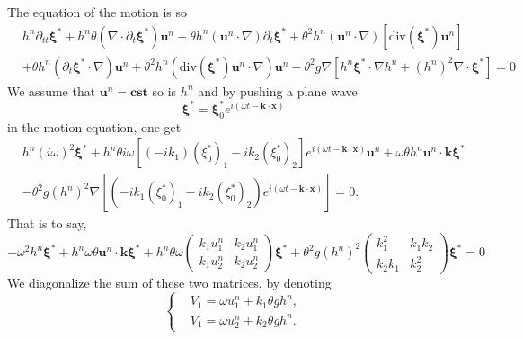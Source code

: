 \documentclass[a4paper, 11pt]{article}
\begin{document}
The equation of the motion is so
\begin{equation*}
\begin{split}
&h^n\partial_{tt}\boldsymbol{\xi}^*+h^n\theta(\nabla \cdot \partial_t \boldsymbol{\xi}^*)\boldsymbol{u}^n+\theta h^n\left(\boldsymbol{u}^n\cdot \nabla \right)\partial_t \boldsymbol{\xi}^*+\theta^2h^n\left(\boldsymbol{u}^n\cdot \nabla \right)\left[\text{div}(\boldsymbol{\xi}^*)\boldsymbol{u}^n\right]\\
&+\theta h^n\left(\partial_t \boldsymbol{\xi}^*\cdot \nabla\right)\boldsymbol{u}^n+\theta^2h^n\left(\text{div}( \boldsymbol{\xi}^*)\boldsymbol{u}^n\cdot \nabla \right)\boldsymbol{u}^n-\theta^2g\nabla \left[h^n\boldsymbol{\xi}^*\cdot \nabla h^n+(h^n)^2\nabla \cdot \boldsymbol{\xi}^*\right]=0
\end{split}
\end{equation*}
We assume that $\boldsymbol{u}^n=\boldsymbol{cst}$ so is $h^n$ and by pushing a plane wave 
\begin{equation*}
\boldsymbol{\xi}^*=\boldsymbol{\xi}_0^*e^{i(\omega t-\boldsymbol{k}\cdot \boldsymbol{x})}
\end{equation*}
in the motion equation, one get
\begin{equation*}
\begin{split}
&h^n(i\omega)^2\boldsymbol{\xi}^*+h^n\theta i\omega\left[(-ik_1)(\xi_0^*)_1-ik_2(\xi_0^*)_2\right]e^{i(\omega t-\boldsymbol{k}\cdot \boldsymbol{x})}\boldsymbol{u}^n+\omega\theta h^n\boldsymbol{u}^n\cdot \boldsymbol{k}\boldsymbol{\xi}^*\\
&-\theta^2g(h^n)^2\nabla\left[(-ik_1(\xi_0^*)_1-ik_2(\xi_0^*)_2)e^{i(\omega t-\boldsymbol{k}\cdot \boldsymbol{x})}\right]=0.
\end{split}
\end{equation*}
That is to say, 
\begin{equation*}
-\omega^2h^n\boldsymbol{\xi}^*+h^n\omega \theta\boldsymbol{u}^n\cdot \boldsymbol{k}\boldsymbol{\xi}^*+h^n\theta\omega \begin{pmatrix}k_1u_1^n&k_2u_1^n\\k_1u_2^n&k_2u_2^n\end{pmatrix}\boldsymbol{\xi}^*+\theta^2g(h^n)^2\begin{pmatrix}k_1^2&k_1k_2\\k_2k_1&k_2^2\end{pmatrix}\boldsymbol{\xi}^*=0
\end{equation*}
We diagonalize the sum of these two matrices, by denoting \begin{equation*}
\left\{\begin{split}
&V_1=\omega u_1^n+k_1\theta gh^n,\\
&V_1=\omega u_2^n+k_2\theta gh^n.
\end{split}\right.
\end{equation*}
\end{document}
